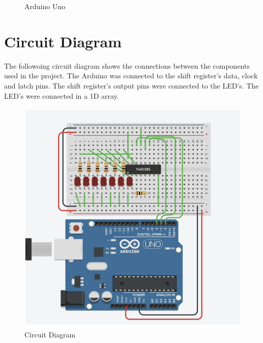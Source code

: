 \documentclass[12pt, a4paper, oneside]{report}
\begin{document}
\begin{figure}[h]
    \centering
    \hfill
    \hfill
    \caption{Arduino Uno}
    \label{fig: arduino}
\end{figure}


\section{Circuit Diagram}

The followoing circuit diagram shows the connections between the components used in the project. The Arduino was connected to the shift register's data, clock and latch pins. The shift register's output pins were connected to the LED's. The LED's were connected in a 1D array.

\begin{figure}[H]
    \centering
    \includegraphics[width=.7\linewidth]{images/Circuit_diagram.png}
    \caption{Circuit Diagram}
    \label{fig: circuit}
\end{figure}
\end{document}
